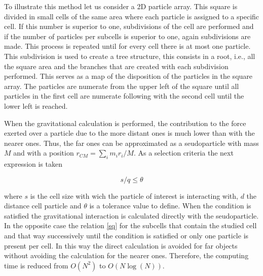 \begin{enumerate}
To illustrate this method let us consider a 2D particle array. 
This square is divided in small cells of the same area where
each particle is assigned to a specific cell. 
If this number is superior to one, subdivisions of the cell
are performed and if the number of particles per subcells 
is superior to one, again subdivisions are made. This
process is repeated until for every cell there is at most
one particle. 
This subdivision is used to create a tree structure, this consists
in a root, i.e., all the square area and the branches that are 
created with each subdivision performed. This serves as a map
of the disposition of the particles in the square array. 
The particles are numerate from the upper left of the square 
until all particles in the first cell are numerate following with
the second cell until the lower left is reached. 

When the gravitational calculation is performed, the contribution 
to the force exerted over a particle due to the more distant ones
is much lower than with the nearer ones. Thus, the far ones can be 
approximated as a seudoparticle with mass $M$ and with a position
$r_{CM}=\sum_im_ir_i/M$. As a selection criteria the next expression
is taken

\begin{equation}
s/q\leq \theta
\label{sq}
\end{equation}

where $s$ is the cell size with wich the particle of interest is interacting 
with, $d$ the distance cell particle and $\theta$ is a tolerance value to
define. When the condition is satisfied the gravitational interaction 
is calculated directly with the seudoparticle. In the opposite case the 
relation \ref{sq} for the subcells that contain the studied cell and that way
successively until the condition is satisfied or only one particle is 
present per cell. In this way the direct calculation is avoided for far
objects without avoiding the calculation for the nearer ones. 
Therefore, the computing time is reduced from $O(N^2)$ to $O(N\log(N))$.


\end{enumerate}
